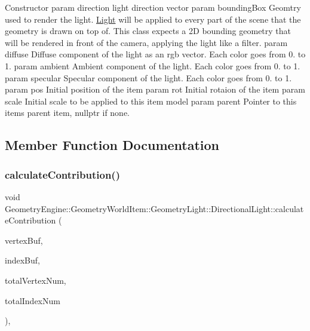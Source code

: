 Constructor param direction light direction vector param bounding\+Box Geomtry used to render the light. \mbox{\hyperlink{class_geometry_engine_1_1_geometry_world_item_1_1_geometry_light_1_1_light}{Light}} will be applied to every part of the scene that the geometry is drawn on top of. This class expects a 2D bounding geometry that will be rendered in front of the camera, applying the light like a filter. param diffuse Diffuse component of the light as an rgb vector. Each color goes from 0. to 1. param ambient Ambient component of the light. Each color goes from 0. to 1. param specular Specular component of the light. Each color goes from 0. to 1. param pos Initial position of the item param rot Initial rotaion of the item param scale Initial scale to be applied to this item model param parent Pointer to this items parent item, nullptr if none. 

\subsection{Member Function Documentation}
\mbox{\label{class_geometry_engine_1_1_geometry_world_item_1_1_geometry_light_1_1_directional_light_af1eac6f1aac9388efe95e1a898cf600f}} 
\subsubsection{\texorpdfstring{calculateContribution()}{calculateContribution()}}
{\footnotesize\ttfamily void Geometry\+Engine\+::\+Geometry\+World\+Item\+::\+Geometry\+Light\+::\+Directional\+Light\+::calculate\+Contribution (\begin{DoxyParamCaption}\item[{Q\+Open\+G\+L\+Buffer $\ast$}]{vertex\+Buf,  }\item[{Q\+Open\+G\+L\+Buffer $\ast$}]{index\+Buf,  }\item[{unsigned int}]{total\+Vertex\+Num,  }\item[{unsigned int}]{total\+Index\+Num }\end{DoxyParamCaption})\hspace{0.3cm}{\ttfamily [protected]}, {\ttfamily [virtual]}}

